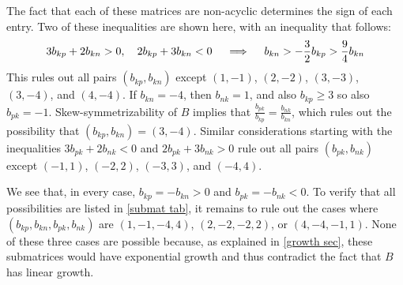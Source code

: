 \documentclass{amsart}
\theoremstyle{definition}
\theoremstyle{remark}
\numberwithin{equation}{section}
\newcommand{\0}{{\mathbf{0}}}
\begin{document}
The fact that each of these matrices are non-acyclic determines the sign of each entry.
Two of these inequalities are shown here, with an inequality that follows:
\[
3b_{kp}+2b_{kn}>0,\quad 2b_{kp}+3b_{kn}<0\quad \implies\quad b_{kn}>-\frac32b_{kp}>\frac94b_{kn}\\
\]
This rules out all pairs $(b_{kp},b_{kn})$ except $(1,-1)$, $(2,-2)$, $(3,-3)$, $(3,-4)$, and $(4,-4)$.
If $b_{kn}=-4$, then $b_{nk}=1$, and also $b_{kp}\ge3$ so also $b_{pk}=-1$.
Skew-symmetrizability of $B$ implies that $\frac{b_{pk}}{b_{kp}}=\frac{b_{nk}}{b_{kn}}$, which rules out the possibility that $(b_{kp},b_{kn})=(3,-4)$.
Similar considerations starting with the inequalities $3b_{pk}+2b_{nk}<0$ and $2b_{pk}+3b_{nk}>0$ rule out all pairs $(b_{pk},b_{nk})$ except $(-1,1)$, $(-2,2)$, $(-3,3)$, and $(-4,4)$.

We see that, in every case, $b_{kp}=-b_{kn}>0$ and $b_{pk}=-b_{nk}<0$.
To verify that all possibilities are listed in \cref{submat tab}, it remains to rule out the cases where $(b_{kp},b_{kn},b_{pk},b_{nk})$ are $(1,-1,-4,4)$, $(2,-2,-2,2)$, or $(4,-4,-1,1)$.
None of these three cases are possible because, as explained in \cref{growth sec}, these submatrices would  have exponential growth and thus contradict the fact that $B$ has linear growth.
\end{document}
